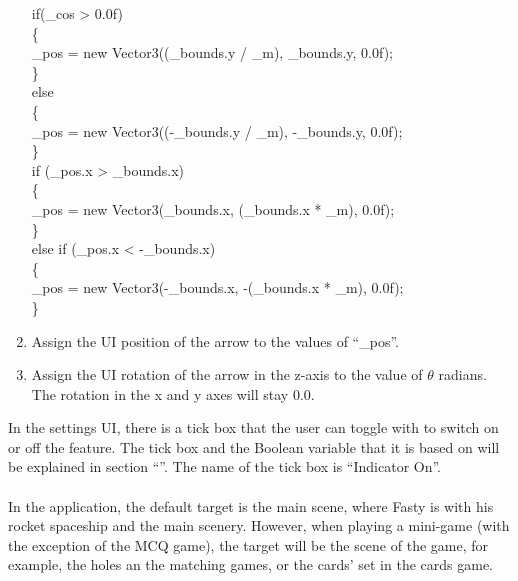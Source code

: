\begin{enumerate}
\begin{codefont}
if(\_cos > 0.0f)\\
\{ \\
\tab \_pos = new Vector3((\_bounds.y / \_m), \_bounds.y, 0.0f);\\
\} \\
else\\
\{\\
\tab \_pos = new Vector3((-\_bounds.y / \_m), -\_bounds.y, 0.0f);\\
\}\\

if (\_pos.x > \_bounds.x)\\
\{\\
\tab \_pos = new Vector3(\_bounds.x, (\_bounds.x * \_m), 0.0f);\\
\}\\
else if (\_pos.x < -\_bounds.x)\\
\{\\
\tab \_pos = new Vector3(-\_bounds.x, -(\_bounds.x * \_m), 0.0f);\\
\}\\
\end{codefont}

\item{Assign the UI position of the arrow to the values of “{\codefont \_pos}”.}
\item{Assign the UI rotation of the arrow in the z-axis to the value of $\theta$ radians. The rotation in the x and y axes will stay 0.0.}
\end{enumerate}
In the settings UI, there is a tick box that the user can toggle with to switch on or off the feature. The tick box and the Boolean variable that it is based on will be explained in section “\textbf{}”. The name of the tick box is “Indicator On”.\\ \\
In the application, the default target is the main scene, where Fasty is with his rocket spaceship and the main scenery. However, when playing a mini-game (with the exception of the \acrshort{MCQ} game), the target will be the scene of the game, for example, the holes an the matching games, or the cards' set in the cards game.
